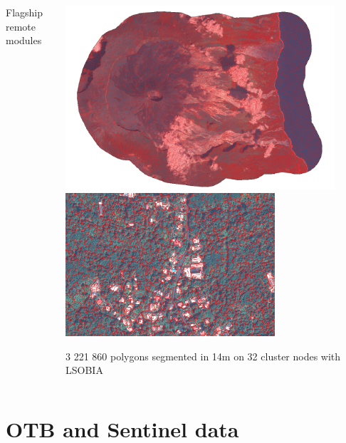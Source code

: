 \documentclass[8pt,aspectratio=169]{beamer}
\begin{document}
\begin{frame}
\begin{columns}
\begin{block}{Flagship remote modules}
    \end{block}
    \begin{center}
    \includegraphics[width=0.9\textwidth]{seg_reunion.png}\\
    \includegraphics[width=0.7\textwidth]{seg_reunion_zoom.png}\\
    \begin{small} 3 221 860 polygons segmented in 14m on 32 cluster nodes with LSOBIA \end{small}
    \end{center}
    \end{columns}

    
    
    \end{frame}

\section{OTB and Sentinel data}
\end{document}
